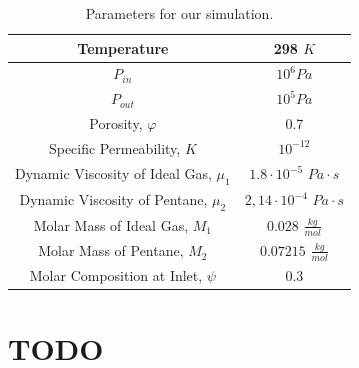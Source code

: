 \documentclass[a4paper,12pt]{article}
\begin{document}
\begin{table}[H]
    \centering
    \caption{Parameters for our simulation.}
    \label{tab:label}
    \begin{tabular}{| c | c |}
        \hline
        Temperature & 298 \(K\) \\
        \hline
        \(P_{in}\) & \(10^6 Pa\) \\
        \hline
        \(P_{out}\) & \(10^5 Pa\) \\
        \hline
        Porosity, \(\varphi\) & 0.7 \\
        \hline
        Specific Permeability, \(K\) & \(10^{-12}\) \\
        \hline
        Dynamic Viscosity of Ideal Gas, \(\mu_1\) &
        \(1.8 \cdot 10^{-5}\) \(Pa \cdot s\) \\
        \hline
        Dynamic Viscosity of Pentane, \(\mu_2\) &
        \(2,14 \cdot 10^{-4}\) \( Pa \cdot s\) \\
        \hline
        Molar Mass of Ideal Gas, \(M_1\) & 
        \(0.028\) \(\frac{kg}{mol}\) \\
        \hline
        Molar Mass of Pentane, \(M_2\) & 
        \(0.07215\) \(\frac{kg}{mol}\) \\
        \hline
        Molar Composition at Inlet, \(\psi\) &
        \(0.3\) \\
        \hline
    \end{tabular}
\end{table}

\section{TODO}
\end{document}
